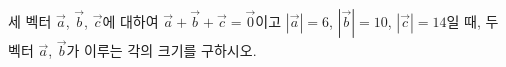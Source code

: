 세 벡터 $\vec{a}$, $\vec{b}$, $\vec{c}$에 대하여 $\vec{a}+\vec{b}+\vec{c}=\vec{0}$이고 $|\vec{a}|=6$, $|\vec{b}|=10$, $|\vec{c}|=14$일 때, 두 벡터 $\vec{a}$, $\vec{b}$가 이루는 각의 크기를 구하시오.
